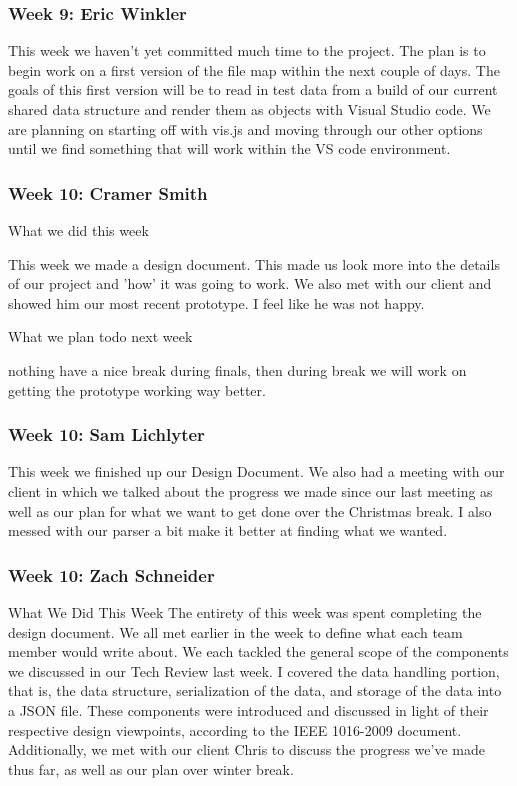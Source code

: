 \subsubsection{Week 9: Eric Winkler}

This week we haven't yet committed much time to the project. The plan is to begin work on a first version of the file map within the next couple of days. The goals of this first version will be to read in test data from a build of our current shared data structure and render them as objects with Visual Studio code. We are planning on starting off with vis.js and moving through our other options until we find something that will work within the VS code environment.

\subsubsection{Week 10: Cramer Smith}

What we did this week 

This week we made a design document. This made us look more into the details of our project and 'how' it was going to work. We also met with our client and showed him our most recent prototype. I feel like he was not happy. 

What we plan todo next week

nothing have a nice break during finals, then during break we will work on getting the prototype working way better.

\subsubsection{Week 10: Sam Lichlyter}

This week we finished up our Design Document. We also had a meeting with our client in which we talked about the progress we made since our last meeting as well as our plan for what we want to get done over the Christmas break. I also messed with our parser a bit make it better at finding what we wanted.

\subsubsection{Week 10: Zach Schneider}

What We Did This Week
The entirety of this week was spent completing the design document. We all met earlier in the week to define what each team member would write about. We each tackled the general scope of the components we discussed in our Tech Review last week. I covered the data handling portion, that is, the data structure, serialization of the data, and storage of the data into a JSON file. These components were introduced and discussed in light of their respective design viewpoints, according to the IEEE 1016-2009 document. Additionally, we met with our client Chris to discuss the progress we've made thus far, as well as our plan over winter break.

